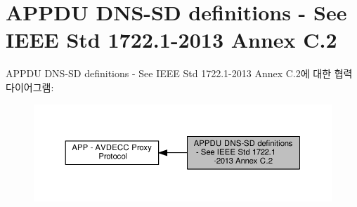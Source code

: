 \hypertarget{group__appdu__dns__sd}{}\section{A\+P\+P\+DU D\+N\+S-\/\+SD definitions -\/ See I\+E\+EE Std 1722.1-\/2013 Annex C.2}
\label{group__appdu__dns__sd}
A\+P\+P\+DU D\+N\+S-\/\+SD definitions -\/ See I\+E\+EE Std 1722.1-\/2013 Annex C.2에 대한 협력 다이어그램\+:
\nopagebreak
\begin{figure}[H]
\begin{center}
\leavevmode
\includegraphics[width=350pt]{group__appdu__dns__sd}
\end{center}
\end{figure}
